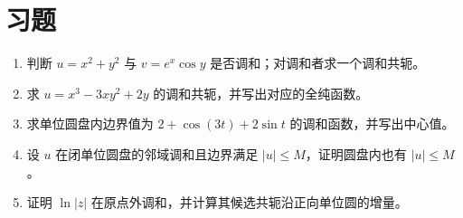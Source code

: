 \section{习题}
\label{sec:ca-harmonic-ex}
\begin{enumerate}
 \item 判断 $u=x^2+y^2$ 与 $v=e^x\cos y$ 是否调和；对调和者求一个调和共轭。
 \item 求 $u=x^3-3xy^2+2y$ 的调和共轭，并写出对应的全纯函数。
 \item 求单位圆盘内边界值为 $2+\cos(3t)+2\sin t$ 的调和函数，并写出中心值。
 \item 设 $u$ 在闭单位圆盘的邻域调和且边界满足 $|u|\le M$，证明圆盘内也有 $|u|\le M$。
 \item 证明 $\ln|z|$ 在原点外调和，并计算其候选共轭沿正向单位圆的增量。
\end{enumerate}

